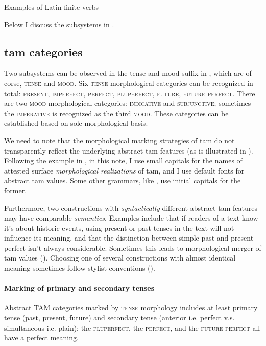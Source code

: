 \documentclass[a4paper, oneside, 12pt]{report}
\newcommand*{\category}[1]{\textsc{#1}}
\begin{document}
\begin{table}[H]
    \centering
    \caption{Examples of Latin finite verbs}
    \label{tbl:latin-finite-verbs}
        
\end{table}

Below I discuss the subsystems in .


\subsection{\acs{tam} categories}\label{sec:verb-inflection.finite-template.tame}

Two subsystems can be observed in the tense and mood suffix in ,
which are of corse, \category{tense} and \category{mood}.
Six \category{tense} morphological categories can be recognized in total:
\category{present}, \category{imperfect}, \category{perfect}, \category{pluperfect}, \category{future}, \category{future perfect}.
There are two \category{mood} morphological categories:
\category{indicative} and \category{subjunctive};
sometimes the \category{imperative} is recognized as the third \category{mood}.
These categories can be established based on sole morphological basis. 

We need to note that the morphological marking strategies of \ac{tam}
do not transparently reflect the underlying abstract \ac{tam} features
(as is illustrated in ).
Following the example in \citet{grimm2021grammar},
in this note, I use small capitals for the names of attested surface \emph{morphological realizations} of \ac{tam},
and I use default fonts for abstract \ac{tam} values.
Some other grammars, like \citet{jacques2021grammar,friesen2017grammar}, 
use initial capitals for the former.

Furthermore, two constructions with \emph{syntactically} different abstract \ac{tam} features
may have comparable \emph{semantics}.
Examples include that if readers of a text know it's about historic events,
using present or past tenses in the text will not influence its meaning,
and that the distinction between simple past and present perfect isn't always considerable.
Sometimes this leads to morphological merger of \ac{tam} values
().
Choosing one of several constructions with almost identical meaning
sometimes follow stylist conventions
().

\paragraph*{Marking of primary and secondary tenses}
Abstract TAM categories marked by \category{tense} morphology includes
at least primary tense (past, present, future) and
secondary tense (anterior i.e. perfect v.s. simultaneous i.e. plain):
the \category{pluperfect}, the \category{perfect}, and the \category{future perfect}
all have a perfect meaning.
\end{document}
